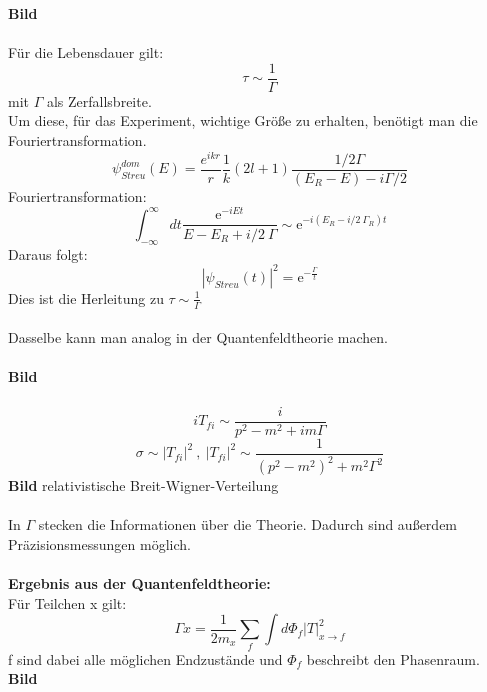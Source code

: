 \textbf{Bild} \\
\\
Für die Lebensdauer gilt: 
\[ \tau \sim \frac{1}{\Gamma} \]
mit $\Gamma$ als Zerfallsbreite. \\
Um diese, für das Experiment, wichtige Größe zu erhalten, benötigt man die 
Fouriertransformation. 
\[ \psi_{Streu}^{dom} (E) = \frac{e^{ikr}}{r} \frac{1}{k} (2l +1) \frac{1/2 
\Gamma}{(E_R -E) - i \Gamma/2} \]
Fouriertransformation:
\[ \int_{-\infty}^{\infty} dt \frac{\mathrm{e}^{-iEt}}{E- E_R + i/2 \ \Gamma} 
\sim \mathrm{e}^{-i (E_R - i/2 \ \Gamma_R) t} \]
Daraus folgt:
\[ \left| \psi_{Streu} (t) \right|^2 = \mathrm{e}^{- \frac{\Gamma}{t}} \]
Dies ist die Herleitung zu $\tau \sim \frac{1}{\Gamma}$ \\
\\
Dasselbe kann man analog in der Quantenfeldtheorie machen. \\
\\
\textbf{Bild}\\
\\
\[ iT_{fi} \sim \frac{i}{p^2 - m^2 + im \Gamma} \]
\[ \sigma \sim \left| T_{fi} \right|^2 \ , \ \left| T_{fi} \right|^2 \sim 
\frac{1}{(p^2 -m^2)^2 + m^2 \Gamma^2} \] 
\textbf{Bild} relativistische Breit-Wigner-Verteilung \\
\\
In $\Gamma$ stecken die Informationen über die Theorie. Dadurch sind außerdem 
Präzisionsmessungen möglich. \\
\\
\textbf{Ergebnis aus der Quantenfeldtheorie:} \\
Für Teilchen x gilt: 
\[ \Gamma x = \frac{1}{2 m_x} \sum_f \int d\Phi_f |T|^2_{x \to f} \]
f sind dabei alle möglichen Endzustände und $\Phi_f$ beschreibt den Phasenraum. 
\\
\textbf{Bild} \\
\\
